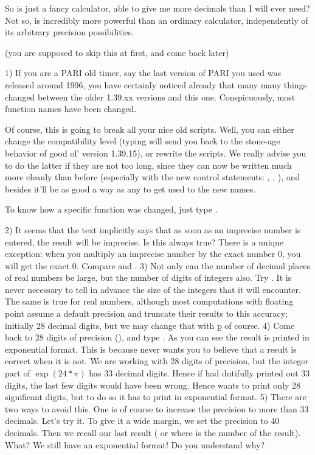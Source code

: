 So  is just a fancy calculator, able to give me more decimals than I
will ever need? Not so,  is incredibly more powerful than an ordinary
calculator, independently of its arbitrary precision possibilities.

 (you are supposed to skip this at first,
and come back later)

1) If you are a PARI old timer, say the last version of PARI you used was
released around 1996, you have certainly noticed already that many many
things changed between the older 1.39.xx versions and this one.
Conspicuously, most function names have been changed.

Of course, this is going to break all your nice old scripts. Well, you can
either change the compatibility level (typing 
will send you back to the stone-age behavior of good ol' version 1.39.15),
or rewrite the scripts. We really advise you to do the latter if they are not
too long, since they can now be written much more cleanly than before
(especially with the new control statements: , ,
), and besides it'll be as good a way as any to get used to the
new names.

To know how a specific function was changed, just type .

2) It seems that the text implicitly says that as soon as an imprecise number
is entered, the result will be imprecise. Is this always true? There is a
unique exception: when you multiply an imprecise number by the exact number
0, you will get the exact 0. Compare  and .
\smallskip
%
3) Not only can the number of decimal places of real numbers be large, but
the number of digits of integers also. Try . It is never necessary
to tell  in advance the size of the integers that it will encounter.
The same is true for real numbers, although most computations with floating
point assume a default precision and truncate their results to this accuracy;
initially 28 decimal digits, but we may change that with \b{p} of course.
\smallskip
%
4) Come back to 28 digits of precision (), and type
. As you can see the result is printed in exponential format.
This is because  never wants you to believe that a result is correct
when it is not. We are working with 28 digits of precision, but the integer
part of $\exp(24*\pi)$ has 33 decimal digits. Hence if  had dutifully
printed out 33 digits, the last few digits would have been wrong. Hence
 wants to print only 28 significant digits, but to do so it has to
print in exponential format. \smallskip
%
5) There are two ways to avoid this. One is of course to increase the
precision to more than 33 decimals. Let's try it. To give it a wide margin,
we set the precision to 40 decimals. Then we recall our last result (\kbd{\%}
or  where  is the number of the result). What? We still have
an exponential format! Do you understand why?

